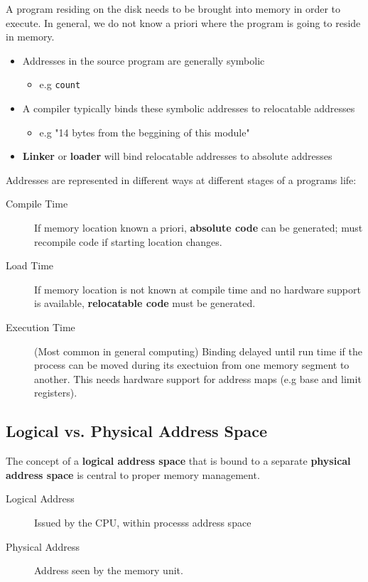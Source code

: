 \documentclass[11pt]{article}
\begin{document}
A program residing on the disk needs to be brought into memory in order to execute.
In general, we do not know a priori where the program is going to reside in memory.

\begin{itemize}
\item Addresses  in the source program are generally symbolic
\begin{itemize}
\item e.g \texttt{count}
\end{itemize}
\item A compiler typically binds these symbolic addresses to relocatable addresses
\begin{itemize}
\item e.g "14 bytes from the beggining of this module"
\end{itemize}
\item \textbf{Linker} or \textbf{loader} will bind relocatable addresses to absolute addresses
\end{itemize}
Addresses are represented in different ways at different stages of a programs life:
\begin{description}
\item[{Compile Time}] If memory location known a priori, \textbf{absolute code} can be generated; must recompile code if starting location changes.
\item[{Load Time}] If memory location is not known at compile time and no hardware support is available, \textbf{relocatable code} must be generated.
\item[{Execution Time}] (Most common in general computing) Binding delayed until run time if the process can be moved during its exectuion from one memory segment to another. This needs hardware support for address maps (e.g base and limit registers).
\end{description}

\subsection{Logical vs. Physical Address Space}
\label{sec:org4cf0f38}
The concept of a \textbf{logical address space} that is bound to a separate \textbf{physical address space} is central to proper memory management.
\begin{description}
\item[{Logical Address}] Issued by the CPU, within processs address space
\item[{Physical Address}] Address seen by the memory unit.
\end{description}
\end{document}
